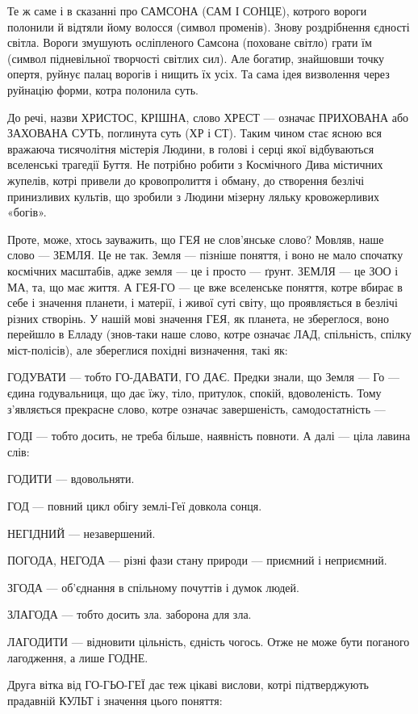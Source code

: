 Те ж саме і в сказанні про САМСОНА (САМ І СОНЦЕ), котрого вороги полонили й
відтяли йому волосся (символ променів). Знову роздрібнення єдності світла.
Вороги змушують осліпленого Самсона (поховане світло) грати їм (символ
підневільної творчості світлих сил). Але богатир, знайшовши точку опертя,
руйнує палац ворогів і нищить їх усіх. Та сама ідея визволення через руйнацію
форми, котра полонила суть.

До речі, назви ХРИСТОС, КРІШНА, слово ХРЕСТ — означає ПРИХОВАНА або ЗАХОВАНА
СУТЬ, поглинута суть (ХР і СТ). Таким чином стає ясною вся вражаюча тисячолітня
містерія Людини, в голові і серці якої відбуваються вселенські трагедії Буття.
Не потрібно робити з Космічного Дива містичних жупелів, котрі привели до
кровопролиття і обману, до створення безлічі принизливих культів, що зробили з
Людини мізерну ляльку кровожерливих «богів».

Проте, може, хтось зауважить, що ГЕЯ не слов’янське слово? Мовляв, наше слово —
ЗЕМЛЯ. Це не так. Земля — пізніше поняття, і воно не мало спочатку космічних
масштабів, адже земля — це і просто — ґрунт. ЗЕМЛЯ — це ЗОО і МА, та, що має
життя. А ГЕЯ-ГО — це вже вселенське поняття, котре вбирає в себе і значення
планети, і матерії, і живої суті світу, що проявляється в безлічі різних
створінь. У нашій мові значення ГЕЯ, як планета, не збереглося, воно перейшло в
Елладу (знов-таки наше слово, котре означає ЛАД, спільність, спілку
міст-полісів), але збереглися похідні визначення, такі як:

ГОДУВАТИ — тобто ГО-ДАВАТИ, ГО ДАЄ. Предки знали, що Земля — Го — єдина
годувальниця, що дає їжу, тіло, притулок, спокій, вдоволеність. Тому
з’являється прекрасне слово, котре означає завершеність, самодостатність —

ГОДІ — тобто досить, не треба більше, наявність повноти. А далі — ціла лавина
слів:

ГОДИТИ — вдовольняти.

ГОД — повний цикл обігу землі-Геї довкола сонця.

НЕГІДНИЙ — незавершений.

ПОГОДА, НЕГОДА — різні фази стану природи — приємний і неприємний.

ЗГОДА — об’єднання в спільному почуттів і думок людей.

ЗЛАГОДА — тобто досить зла. заборона для зла.

ЛАГОДИТИ — відновити цільність, єдність чогось. Отже не може бути поганого
лагодження, а лише ГОДНЕ.

Друга вітка від ГО-ГЬО-ГЕЇ дає теж цікаві вислови, котрі підтверджують
прадавній КУЛЬТ і значення цього поняття:

